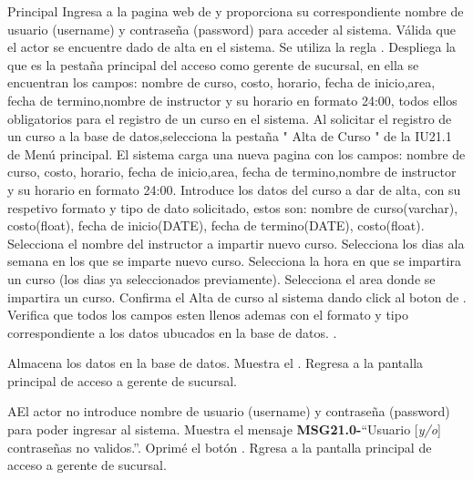 	\newpage
	\begin{UCtrayectoria}{Principal}
	\UCpaso[\UCactor] Ingresa a la pagina web de \label{CU21.0Login} y proporciona su correspondiente nombre de usuario (username) y contraseña (password) para acceder al sistema.
		\UCpaso Válida que el actor se encuentre dado de alta en el sistema. Se utiliza la regla  .
		\UCpaso Despliega la  que es la pestaña principal del acceso como gerente de sucursal, en ella se encuentran los campos: nombre de curso, costo, horario, fecha de inicio,area, fecha de termino,nombre de instructor y su  horario en formato 24:00, todos ellos obligatorios para el registro de un curso en el sistema.
	\UCpaso[\UCactor] Al solicitar el registro de un curso a la base de datos,selecciona la pestaña " Alta de Curso  " de la IU21.1 de Menú principal.
	\UCpaso El sistema carga una nueva pagina con los campos: nombre de curso, costo, horario, fecha de inicio,area, fecha de termino,nombre de instructor y su  horario en formato 24:00.
	\UCpaso[\UCactor] Introduce los datos del curso a dar de alta, con su respetivo formato y tipo de dato solicitado, estos son: nombre de curso(varchar), costo(float), fecha de inicio(DATE), fecha de termino(DATE), costo(float).
    \UCpaso[\UCactor] Selecciona el nombre del instructor a impartir nuevo curso.
	\UCpaso[\UCactor] Selecciona los dias ala semana en los que se imparte nuevo curso.
	\UCpaso[\UCactor] Selecciona la hora en que se impartira un curso (los dias ya seleccionados previamente).
	\UCpaso[\UCactor] Selecciona el area donde se impartira un curso.
	\UCpaso[\UCactor] Confirma el Alta de curso al sistema dando click al boton  de \label{IU21.1 Alta Curso}.
	\UCpaso Verifica que todos los campos esten llenos ademas con el formato y tipo correspondiente a los datos ubucados en la base de datos.  .
		
		\UCpaso Almacena los datos en la base de datos.
		\UCpaso Muestra el .
		\UCpaso Regresa a la pantalla principal de acceso a gerente de sucursal.
\end{UCtrayectoria}

\begin{UCtrayectoriaA}{A}{El actor no introduce nombre de usuario (username) y contraseña (password) para poder ingresar al sistema.}
			\UCpaso Muestra el mensaje {\bf MSG21.0-}``Usuario [{\em y/o}] contraseñas no validos.''.
			\UCpaso[\UCactor] Oprimé el botón .
			\UCpaso Rgresa a la pantalla principal de acceso a gerente de sucursal.
		\end{UCtrayectoriaA}

